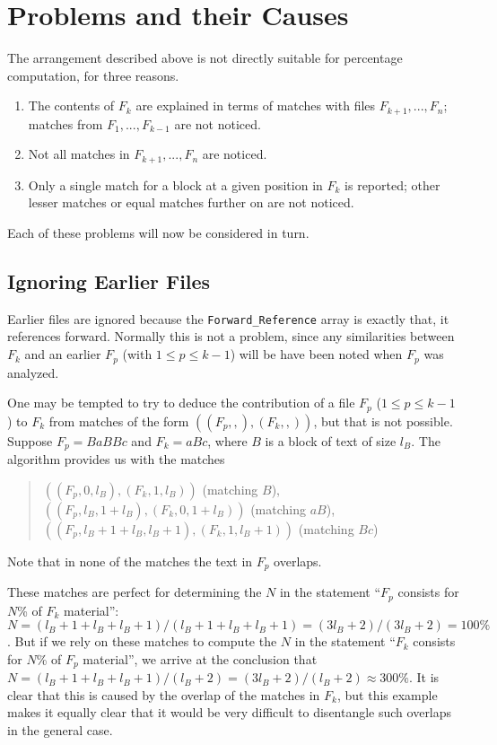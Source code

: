 \documentclass[a4paper,fleqn]{article}
\newcommand{\cw}[1]{\texttt{#1}}
\begin{document}
\section{Problems and their Causes}

The arrangement described above is not directly suitable for percentage
computation, for three reasons.

\begin{enumerate}
\item
The contents of $F_k$ are explained in terms of matches with files
$F_{k+1}, ..., F_n$; matches from $F_1, ..., F_{k-1}$ are not noticed.
\item
Not all matches in $F_{k+1}, ..., F_n$ are noticed.
\item
Only a single match for a block at a given position in $F_k$ is reported;
other lesser matches or equal matches further on are not noticed.
\end{enumerate}
Each of these problems will now be considered in turn.

\subsection{Ignoring Earlier Files}

Earlier files are ignored because the \cw{Forward\_Reference} array is exactly
that, it references forward. Normally this is not a problem, since any
similarities between $F_k$ and an earlier $F_p$ (with
$ 1 \leq p \leq {k-1}$) will be have been noted when $F_p$ was analyzed.

One may be tempted to try to deduce the contribution of a file $F_p$
($ 1 \leq p \leq {k-1}$) to $F_k$ from matches of the form
$((F_p,,),(F_k,,))$,
but that is not possible.
Suppose $F_p=BaBBc$ and $F_k=aBc$, where $B$ is a block of text of size $l_B$.
The algorithm provides us with the matches
\begin{quote}
$((F_p,0,l_B),(F_k,1,l_B))$ (matching $B$),\\
$((F_p,l_B,1+l_B),(F_k,0,1+l_B))$ (matching $aB$),\\
$((F_p,l_B+1+l_B,l_B+1),(F_k,1,l_B+1))$ (matching $Bc$)
\end{quote}
Note that in none of the matches the text in $F_p$ overlaps.

These matches are perfect for determining the $N$ in the statement
``$F_p$ consists for $N$\% of $F_k$ material'':
$N = (l_B+1+l_B+l_B+1) / (l_B+1+l_B+l_B+1) = (3l_B+2) / (3l_B+2) = 100\%$.
But if we rely on these matches to compute the $N$ in the statement
``$F_k$ consists for $N$\% of $F_p$ material'', we arrive at the conclusion
that $N = (l_B+1+l_B+l_B+1) / (l_B+2) = (3l_B+2) / (l_B+2) \approx 300\%$.
It is clear that this is caused by the overlap of the matches in $F_k$, but
this example makes it equally clear that it would be very difficult to
disentangle such overlaps in the general case.
\end{document}
